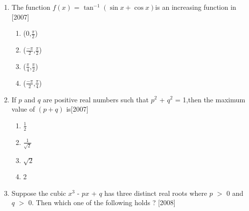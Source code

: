 \documentclass[journal,12pt,onecolumn]{IEEEtran}
\theoremstyle{remark}
\begin{document}
\begin{enumerate}
\begin{multicols}{4}
\begin{enumerate}
        \end{enumerate}
        \end{multicols}
            
        \item The function $f(x)$ = $\tan^{-1}(\sin{x} + \cos{x})$is an increasing function in \hfill[2007]
         \begin{multicols}{4}
    
        \begin{enumerate}
        
            
        
      \item (0,$\frac{\pi}{2}$)
        \item ($\frac{-\pi}{2}$,$\frac{\pi}{2}$)
        \item ($\frac{\pi}{4}$,$\frac{\pi}{2}$)
        \item ($\frac{-\pi}{2}$,$\frac{\pi}{4}$)
        
            
        
            
        
        \end{enumerate}
        \end{multicols}
            
        \item If $p$ and $q$ are positive real numbers such that $p^2$ + $q^2$ = 1,then the maximum value of $(p + q)$ is\hfill[2007]
         \begin{multicols}{4}
        \begin{enumerate}
        
            

        \item $\frac{1}{2}$
        \item $\frac{1}{\sqrt{2}}$
        \item $\sqrt{2}$
        \item 2
        \end{enumerate}
        \end{multicols}
            
        \item Suppose the cubic $x^3$ - $p$$x$ + $q$ has three distinct real roots where $p$ $>$ 0 and $q$ $>$ 0. Then which one of the following holds ? \hfill[2008]
         
        \begin{enumerate}
        
            
        

\end{enumerate}
\end{enumerate}
\end{document}
